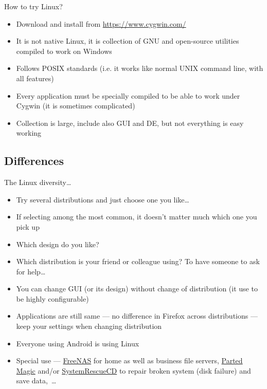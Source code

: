 \documentclass[compress, ucs, xelatex, 11pt, xcolor=svgnames,
  hyperref={
    bookmarks=true,
    unicode=true,
    colorlinks=true,
    pdftitle={Linux, command line and MetaCentrum},
    plainpages=false,
    pdfauthor={Vojtech Zeisek},
    pdfsubject={Course about use of Linux command line, writing shell scripts and using MetaCentrum of CESNET},
    pdfcreator={XeLaTeX},
    pdfkeywords={Linux, GNU, BASH, shell, command line, MetaCentrum},
    linkcolor=DarkRed,
    anchorcolor=DarkBlue,
    citecolor=Indigo,
    filecolor=NavyBlue,
    menucolor=DarkMagenta,
    urlcolor=DarkBlue,
    pdftex},
  url={hyphens, lowtilde} %
  ]{beamer}
\begin{document}
\begin{frame}[allowframebreaks]{How to try Linux?}
\begin{itemize}
    \begin{itemize}
      \item Download and install from \url{https://www.cygwin.com/}
      \item It is not native Linux, it is collection of GNU and open-source utilities compiled to work on Windows
      \item Follows POSIX standards (i.e. it works like normal UNIX command line, with all features)
      \item Every application must be specially compiled to be able to work under Cygwin (it is sometimes complicated)
      \item Collection is large, include also GUI and DE, but not everything is easy working
    \end{itemize}
  \end{itemize}
\end{frame}

\subsection{Differences}

\begin{frame}{The Linux diversity\ldots}
  \begin{itemize}
    \item Try several distributions and just choose one you like\ldots
    \item If selecting among the most common, it doesn't matter much which one you pick up
    \item Which design do you like?
    \item Which distribution is your friend or colleague using? To have someone to ask for help\ldots
    \item You can change GUI (or its design) without change of distribution (it use to be highly configurable)
    \item Applications are still same --- no difference in Firefox across distributions --- keep your settings when changing distribution
    \item Everyone using Android is using Linux
    \item Special use --- \href{https://www.freenas.org/}{FreeNAS} for home as well as business file servers, \href{https://partedmagic.com/}{Parted Magic} and/or \href{https://www.system-rescue-cd.org/}{SystemRescueCD} to repair broken system (disk failure) and save data,~\ldots
  \end{itemize}
\end{frame}
\end{document}
